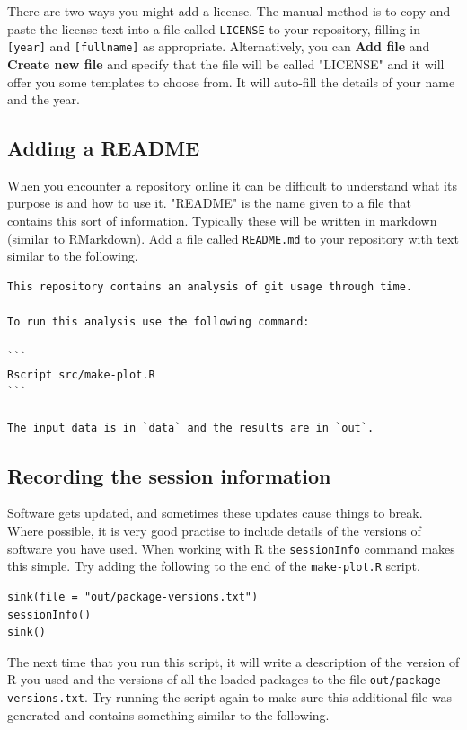 \documentclass[11pt,onecolumn]{scrartcl}
\begin{document}
There are two ways you might add a license. The manual method is to copy and
paste the license text into a file called \texttt{LICENSE} to your repository, filling in
\texttt{[year]} and \texttt{[fullname]} as appropriate. Alternatively, you can \textbf{Add file} and \textbf{Create
new file} and specify that the file will be called "LICENSE" and it will offer
you some templates to choose from. It will auto-fill the details of your name
and the year.

\subsection{Adding a README}
\label{sec:org4c7e86a}

When you encounter a repository online it can be difficult to understand what
its purpose is and how to use it. "README" is the name given to a file that
contains this sort of information. Typically these will be written in markdown
(similar to RMarkdown). Add a file called \texttt{README.md} to your repository with text
similar to the following.

\begin{verbatim}
This repository contains an analysis of git usage through time.

To run this analysis use the following command:

```
Rscript src/make-plot.R
```

The input data is in `data` and the results are in `out`.
\end{verbatim}

\subsection{Recording the session information}
\label{sec:orgb36167d}

Software gets updated, and sometimes these updates cause things to break. Where
possible, it is very good practise to include details of the versions of
software you have used. When working with R the \texttt{sessionInfo} command makes this
simple. Try adding the following to the end of the \texttt{make-plot.R} script.

\lstset{language=r,label= ,caption= ,captionpos=b,numbers=none}
\begin{lstlisting}
sink(file = "out/package-versions.txt")
sessionInfo()
sink()
\end{lstlisting}

The next time that you run this script, it will write a description of the
version of R you used and the versions of all the loaded packages to the file
\texttt{out/package-versions.txt}. Try running the script again to make sure this
additional file was generated and contains something similar to the following.
\end{document}

